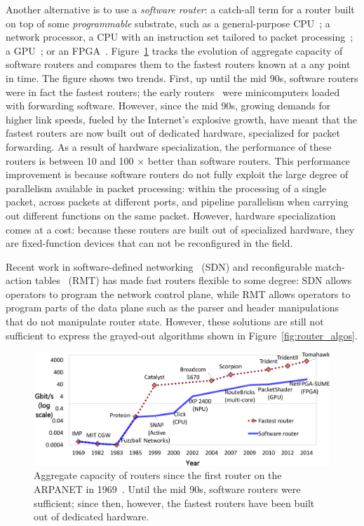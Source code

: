 Another alternative is to use a \textit{software router}: a catch-all term for
a router built on top of some \textit{programmable} substrate, such as a
general-purpose CPU~\cite{click, routebricks}; a network processor, a CPU with
an instruction set tailored to packet processing~\cite{ixp4xx, ixp2800}; a
GPU~\cite{packetshader}; or an FPGA~\cite{netfpga}.
Figure~\ref{fig:router_evolution} tracks the evolution of aggregate capacity of
software routers and compares them to the fastest routers known at a any point
in time. The figure shows two trends. First, up until the mid 90s, software
routers were in fact the fastest routers; the early routers~\cite{imp} were
minicomputers loaded with forwarding software. However, since the mid 90s,
growing demands for higher link speeds, fueled by the Internet's explosive
growth, have meant that the fastest routers are now built out of dedicated
hardware, specialized for packet forwarding. As a result of hardware
specialization, the performance of these routers is between 10 and 100 $\times$
better than software routers.  This performance improvement is because software
routers do not fully exploit the large degree of parallelism available in
packet processing: within the processing of a single packet, across packets at
different ports, and pipeline parallelism when carrying out different functions
on the same packet. However, hardware specialization comes at a cost: because
these routers are built out of specialized hardware, they are fixed-function
devices that can not be reconfigured in the field.

Recent work in software-defined networking~\cite{openflow} (SDN) and
reconfigurable match-action tables~\cite{rmt} (RMT) has made fast routers
flexible to some degree: SDN allows operators to program the network control
plane, while RMT allows operators to program parts of the data plane such as
the parser and header manipulations that do not manipulate router state.
However, these solutions are still not sufficient to express the grayed-out
algorithms shown in Figure~\ref{fig:router_algos}.

\begin{figure}
\centering
\includegraphics[width=\columnwidth]{router_evolution.pdf}
\caption{Aggregate capacity of routers since the first router on the ARPANET in
1969~\cite{imp}. Until the mid 90s, software routers were sufficient; since
then, however, the fastest routers have been built out of dedicated hardware.}
\label{fig:router_evolution}
\end{figure}

